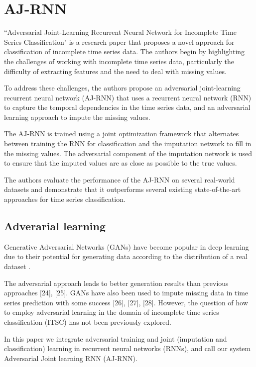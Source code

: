 \section{AJ-RNN}
``Adversarial Joint-Learning Recurrent Neural Network for Incomplete Time Series Classification" \cite{ajrnn} is a research paper that proposes a novel approach for classification of incomplete time series data.
The authors begin by highlighting the challenges of working with incomplete time series data, particularly the difficulty of extracting features and the need to deal with missing values.

To address these challenges, the authors propose an adversarial joint-learning recurrent neural network (AJ-RNN) that uses a recurrent neural network (RNN) to capture the temporal dependencies in the time series data, and an adversarial learning approach to impute the missing values.

The AJ-RNN is trained using a joint optimization framework that alternates between training the RNN for classification and the imputation network to fill in the missing values.
The adversarial component of the imputation network is used to ensure that the imputed values are as close as possible to the true values.

The authors evaluate the performance of the AJ-RNN on several real-world datasets and demonstrate that it outperforms several existing state-of-the-art approaches for time series classification.

\subsection{Adverarial learning}

Generative Adversarial Networks (GANs) have become popular in deep learning due to their potential for generating data according to the distribution of a real dataset \cite{goodfellow2014generative, ledig2017photo}.

The adversarial approach leads to better generation results than previous approaches [24], [25]. 
GANs have also been used to impute missing data in time series prediction with some success [26], [27], [28]. 
However, the question of how to employ adversarial learning in the domain of incomplete time series classification (ITSC) has not been previously explored.

In this paper we integrate adversarial training and joint (imputation and classification) learning in recurrent neural
networks (RNNs), and call our system Adversarial Joint learning RNN (AJ-RNN).

